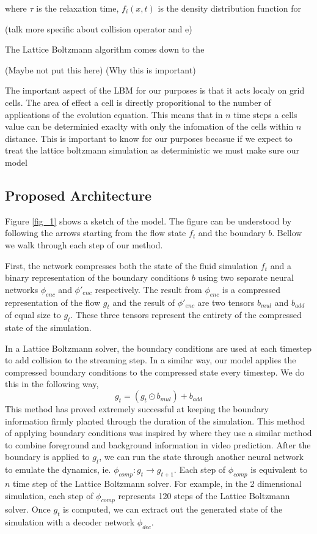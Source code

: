 \documentclass{article}
\begin{document}
where $\tau$ is the relaxation time, $f_i(x,t)$ is the density distribution function for

(talk more specific about collision operator and e)

The Lattice Boltzmann algorithm comes down to the 

(Maybe not put this here)
(Why this is important)

The important aspect of the LBM for our purposes is that it acts localy on grid cells. The area of effect a cell is directly proporitional to the number of applications of the evolution equation. This means that in $n$ time steps a cells value can be determinied exaclty with only the infomation of the cells within $n$ distance. This is important to know for our purposes becasue if we expect to treat the lattice boltzmann simulation as deterministic we must make sure our model 

\subsection{Proposed Architecture}

Figure \ref{fig_1} shows a sketch of the model. The figure can be understood by following the arrows starting from the flow state $f_t$ and the boundary $b$. Bellow we walk through each step of our method.

First, the network compresses both the state of the fluid simulation $f_t$ and a binary representation of the boundary conditions $b$ using two separate neural networks $\phi_{enc}$ and $\phi'_{enc}$ respectively. The result from $\phi_{enc}$ is a compressed representation of the flow $g_t$ and the result of $\phi'_{enc}$ are two tensors $b_{mul}$ and $b_{add}$ of equal size to $g_t$. These three tensors represent the entirety of the compressed state of the simulation.

In a Lattice Boltzmann solver, the boundary conditions are used at each timestep to add collision to the streaming step. In a similar way, our model applies the compressed boundary conditions to the compressed state every timestep. We do this in the following way,
\begin{equation}
  g_t = (g_t \odot b_{mul}) + b_{add}
\end{equation}
This method has proved extremely successful at keeping the boundary information firmly planted through the duration of the simulation. This method of applying boundary conditions was inspired by \cite{vondrick2016generating} where they use a similar method to combine foreground and background information in video prediction. After the boundary is applied to $g_t$, we can run the state through another neural network to emulate the dynamics, ie. $\phi_{comp}:g_{t} \rightarrow g_{t+1}$. Each step of $\phi_{comp}$ is equivalent to $n$ time step of the Lattice Boltzmann solver. For example, in the 2 dimensional simulation, each step of $\phi_{comp}$ represents 120 steps of the Lattice Boltzmann solver. Once $g_t$ is computed, we can extract out the generated state of the simulation with a decoder network $\phi_{dec}$. 
\end{document}
